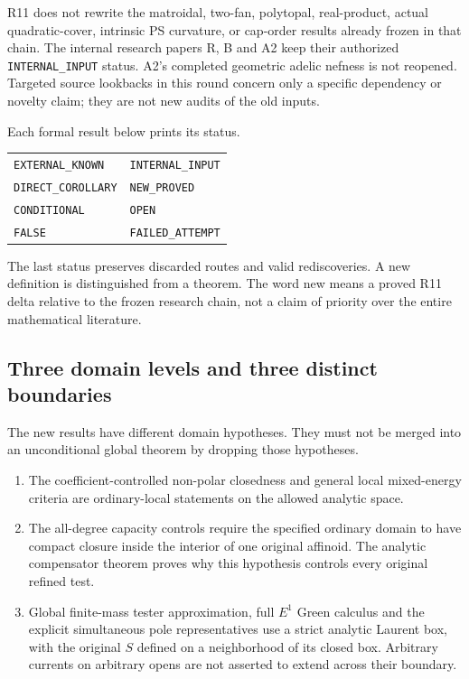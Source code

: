 \documentclass[11pt,a4paper]{article}
\numberwithin{equation}{section}
\theoremstyle{definition}
\theoremstyle{remark}
\begin{document}
R11 does not rewrite the matroidal, two-fan, polytopal,
real-product, actual quadratic-cover, intrinsic PS
curvature, or cap-order results already frozen in that
chain.  The internal research papers R, B and A2 keep
their authorized \texttt{INTERNAL\_INPUT} status.
A2's completed geometric adelic nefness is not reopened.
Targeted source lookbacks in this round concern only
a specific dependency or novelty claim; they are not
new audits of the old inputs.

Each formal result below prints its status.
\begin{center}
\begin{tabular}{ll}
\texttt{EXTERNAL\_KNOWN}&\texttt{INTERNAL\_INPUT}\\
\texttt{DIRECT\_COROLLARY}&\texttt{NEW\_PROVED}\\
\texttt{CONDITIONAL}&\texttt{OPEN}\\
\texttt{FALSE}&\texttt{FAILED\_ATTEMPT}
\end{tabular}
\end{center}
The last status preserves discarded routes and valid rediscoveries.
A new definition is distinguished from a theorem.
The word new means a proved R11 delta relative to the
frozen research chain, not a claim of priority over
the entire mathematical literature.

\subsection{Three domain levels and three distinct boundaries}

The new results have different domain hypotheses.
They must not be merged into an unconditional global
theorem by dropping those hypotheses.
\begin{enumerate}
\item The coefficient-controlled non-polar closedness
and general local mixed-energy criteria are ordinary-local
statements on the allowed analytic space.
\item The all-degree capacity controls require the
specified ordinary domain to have compact closure
inside the interior of one original affinoid.
The analytic compensator theorem proves why this
hypothesis controls every original refined test.
\item Global finite-mass tester approximation, full
$E^1$ Green calculus and the explicit simultaneous
pole representatives use a strict analytic Laurent
box, with the original $S$ defined on a neighborhood
of its closed box.  Arbitrary currents on arbitrary
opens are not asserted to extend across their boundary.
\end{enumerate}
\end{document}
